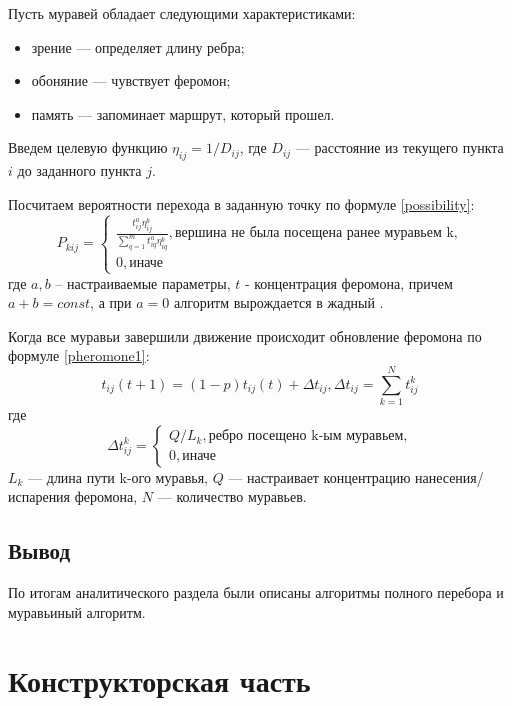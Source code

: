 \documentclass[a4paper,14pt]{extreport}
\begin{document}
Пусть муравей обладает следующими характеристиками:
\begin{itemize}
	\item зрение — определяет длину ребра;
	\item обоняние — чувствует феромон;
	\item память — запоминает маршрут, который прошел.
\end{itemize}

Введем целевую функцию $\eta_{ij} = 1 / D_{ij}$, где $D_{ij}$ — расстояние из текущего пункта $i$ до заданного пункта $j$.

Посчитаем вероятности перехода в заданную точку по формуле \eqref{possibility}:
\begin{equation}
	\label{possibility}
	P_{kij} = \begin{cases}
		\frac{t_{ij}^a\eta_{ij}^b}{\sum_{q=1}^m t^a_{iq}\eta^b_{iq}}, \textrm{вершина не была посещена ранее муравьем k,} \\
		0, \textrm{иначе}
	\end{cases}
\end{equation}
где $a, b$ -- настраиваемые параметры, $t$ - концентрация феромона, причем $a + b = const$, а при $a = 0$ алгоритм вырождается в жадный \cite{Levitin}.

Когда все муравьи завершили движение происходит обновление феромона по формуле \eqref{pheromone1}:
\begin{equation}
	\label{pheromone1}
	t_{ij}(t+1) = (1-p)t_{ij}(t) + \Delta t_{ij}, \Delta t_{ij} = \sum_{k=1}^N t^k_{ij}
\end{equation}
где
\begin{equation}
	\label{pheromone2}
	\Delta t^k_{ij} = \begin{cases}
		Q/L_{k}, \textrm{ребро посещено k-ым муравьем,} \\
		0, \textrm{иначе}
	\end{cases}
\end{equation}
$L_{k}$ — длина пути k-ого муравья, $Q$ — настраивает концентрацию нанесения/испарения феромона, $N$ — количество муравьев.

\section*{Вывод}
По итогам аналитического раздела были описаны алгоритмы полного перебора и муравьиный алгоритм.


\chapter{Конструкторская часть}
\end{document}
